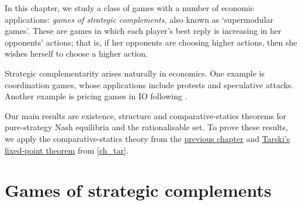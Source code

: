 




In this chapter, we study a class of games with a number of economic applications: \emph{games of strategic complements,} also known as `supermodular games'. These are games in which each player's best reply is increasing in her opponents' actions; that is, if her opponents are choosing higher actions, then she wishes herself to choose a higher action.

Strategic complementarity arises naturally in economics. One example is coordination games, whose applications include protests and speculative attacks. Another example is pricing games in IO following \textcite{Bertrand1883}.

Our main results are existence, structure and comparative-statics theorems for pure-strategy Nash equilibria and the rationalisable set. To prove these results, we apply the comparative-statics theory from the \hyperref[ch_mcs]{previous chapter} and \hyperref[theorem:tarski]{Tarski's fixed-point theorem} from \cref{ch_tar}.



\section{Games of strategic complements}
\label{spm:spm}

